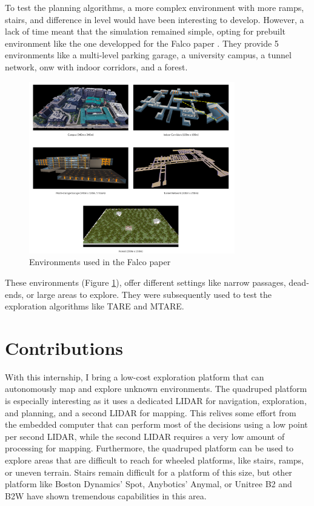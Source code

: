 \documentclass[12pt]{article}
\begin{document}
    To test the planning algorithms, a more complex environment with more ramps, stairs, and difference in level would have been interesting to develop. However, a lack of time meant that the simulation remained simple, opting for prebuilt environment like the one developped for the Falco paper \cite{zhang2020falco}. They provide 5 environments like a multi-level parking garage, a university campus, a tunnel network, onw with indoor corridors, and a forest. 
    
    \begin{figure}[H]
        \centering
        \includegraphics[width=0.8\textwidth]{Images/falco_environments.png}
        \caption{Environments used in the Falco paper}
        \label{fig:falco_environments}
    \end{figure}
    
    These environments (Figure \ref{fig:falco_environments}), offer different settings like narrow passages, dead-ends, or large areas to explore. They were subsequently used to test the exploration algorithms like TARE and MTARE.

\section{Contributions}

    With this internship, I bring a low-cost exploration platform that can autonomously map and explore unknown environments. The quadruped platform is especially interesting as it uses a dedicated LIDAR for navigation, exploration, and planning, and a second LIDAR for mapping. This relives some effort from the embedded computer that can perform most of the decisions using a low point per second LIDAR, while the second LIDAR requires a very low amount of processing for mapping. Furthermore, the quadruped platform can be used to explore areas that are difficult to reach for wheeled platforms, like stairs, ramps, or uneven terrain. Stairs remain difficult for a platform of this size, but other platform like Boston Dynamics' Spot, Anybotics' Anymal, or Unitree B2 and B2W have shown tremendous capabilities in this area.
\end{document}
